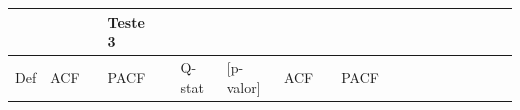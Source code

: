 \documentclass[
]{book}
\theoremstyle{definition}
\theoremstyle{definition}
\theoremstyle{definition}
\theoremstyle{remark}
\begin{document}
\begin{longtable}[]{@{}lllllllllllllllllll@{}}
\begin{minipage}[b]{0.05\columnwidth}
\strut
\end{minipage} & \begin{minipage}[b]{0.02\columnwidth}\raggedright
\strut
\end{minipage} & \begin{minipage}[b]{0.01\columnwidth}\raggedright
\strut
\end{minipage} & \begin{minipage}[b]{0.03\columnwidth}\raggedright
Teste 3\strut
\end{minipage} & \begin{minipage}[b]{0.01\columnwidth}\raggedright
\strut
\end{minipage} & \begin{minipage}[b]{0.03\columnwidth}\raggedright
\strut
\end{minipage} & \begin{minipage}[b]{0.05\columnwidth}\raggedright
\strut
\end{minipage}\tabularnewline
\midrule
\endhead
\begin{minipage}[t]{0.05\columnwidth}\raggedright
Def\strut
\end{minipage} & \begin{minipage}[t]{0.04\columnwidth}\raggedright
ACF\strut
\end{minipage} & \begin{minipage}[t]{0.02\columnwidth}\raggedright
\strut
\end{minipage} & \begin{minipage}[t]{0.03\columnwidth}\raggedright
PACF\strut
\end{minipage} & \begin{minipage}[t]{0.02\columnwidth}\raggedright
\strut
\end{minipage} & \begin{minipage}[t]{0.04\columnwidth}\raggedright
Q-stat\strut
\end{minipage} & \begin{minipage}[t]{0.05\columnwidth}\raggedright
{[}p-valor{]}\strut
\end{minipage} & \begin{minipage}[t]{0.04\columnwidth}\raggedright
ACF\strut
\end{minipage} & \begin{minipage}[t]{0.02\columnwidth}\raggedright
\strut
\end{minipage} & \begin{minipage}[t]{0.03\columnwidth}\raggedright
PACF\strut
\end{minipage} & \begin{minipage}[t]{0.02\columnwidth}\raggedright

\end{minipage}
\end{longtable}
\end{document}
